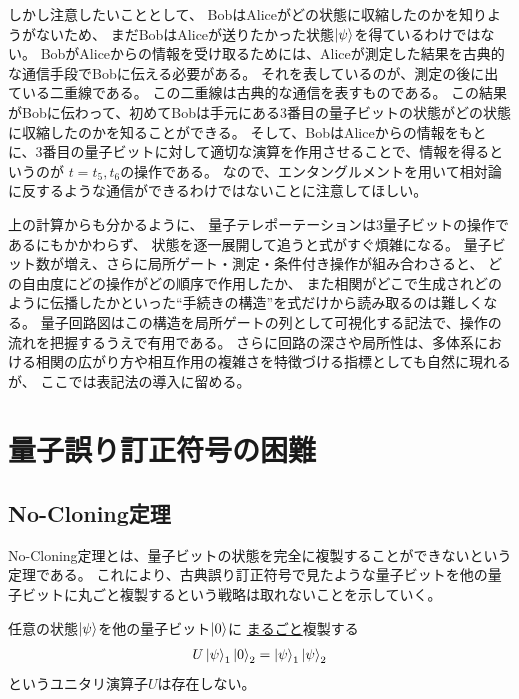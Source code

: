 \documentclass[../master.tex]{subfiles}
\begin{document}
しかし注意したいこととして、
BobはAliceがどの状態に収縮したのかを知りようがないため、
まだBobはAliceが送りたかった状態\(\ket{\psi}\)を得ているわけではない。
BobがAliceからの情報を受け取るためには、Aliceが測定した結果を古典的な通信手段でBobに伝える必要がある。
それを表しているのが、測定の後に出ている二重線である。
この二重線は古典的な通信を表すものである。
この結果がBobに伝わって、初めてBobは手元にある3番目の量子ビットの状態がどの状態に収縮したのかを知ることができる。
そして、BobはAliceからの情報をもとに、3番目の量子ビットに対して適切な演算を作用させることで、情報を得るというのが
\(t=t_5,t_6\)の操作である。
なので、エンタングルメントを用いて相対論に反するような通信ができるわけではないことに注意してほしい。

上の計算からも分かるように、
量子テレポーテーションは3量子ビットの操作であるにもかかわらず、
状態を逐一展開して追うと式がすぐ煩雑になる。
量子ビット数が増え、さらに局所ゲート・測定・条件付き操作が組み合わさると、
どの自由度にどの操作がどの順序で作用したか、
また相関がどこで生成されどのように伝播したかといった“手続きの構造”を式だけから読み取るのは難しくなる。
量子回路図はこの構造を局所ゲートの列として可視化する記法で、操作の流れを把握するうえで有用である。
さらに回路の深さや局所性は、多体系における相関の広がり方や相互作用の複雑さを特徴づける指標としても自然に現れる
\cite{Farrelly2020-bv,Chen2024-cv}が、
ここでは表記法の導入に留める。


\section{量子誤り訂正符号の困難}
\subsection*{No-Cloning定理}
No-Cloning定理とは、量子ビットの状態を完全に複製することができないという定理である。
これにより、古典誤り訂正符号で見たような量子ビットを他の量子ビットに丸ごと複製するという戦略は取れないことを示していく。

\begin{NoteBox}[title=No-Cloning定理]{}
任意の状態\(\ket{\psi}\)を他の量子ビット\(\ket{0}\)に
    \underline{まるごと}複製する
    \begin{equation}\begin{aligned}[b]
        U\ket{\psi}_1\ket{0}_2 = \ket{\psi}_1\ket{\psi}_2
    \end{aligned}\end{equation}
    というユニタリ演算子\(U\)は存在しない。
\end{NoteBox}
\end{document}
